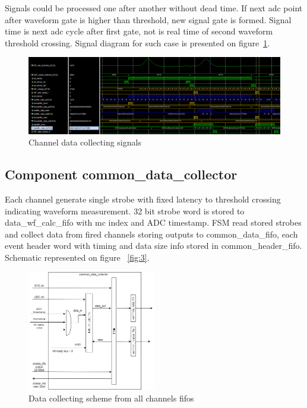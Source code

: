 \documentclass{article}
\begin{document}
Signals could be processed one after another without dead time. If next adc point after waveform gate is higher than threshold, new signal gate is formed. Signal time is next adc cycle after first gate, not is real time of second waveform threshold crossing. Signal diagram for such case is presented on figure~\ref{fig:5}.


\begin{figure}[H]
	\centering 
	\includegraphics[width=1.0\textwidth]{ADC_ch_data_collector_wave_pileup.png}
	\caption{\label{fig:5} Channel data collecting signals}
\end{figure}














\subsection{Component common\_data\_collector}
Each channel generate single strobe with fixed latency to threshold crossing indicating waveform measurement. 32 bit strobe word is stored to data\_wf\_calc\_fifo with mc index and ADC timestamp. FSM read stored strobes and collect data from fired channels storing outputs to common\_data\_fifo, each event header word with timing and data size info stored in common\_header\_fifo. Schematic represented on figure ~\ref{fig:3}.

\begin{figure}[H]
	\centering 
	\includegraphics[width=0.5\textwidth]{ADC_common_event_collection.png}
	\caption{\label{fig:6} Data collecting scheme from all channels fifos}
\end{figure}
\end{document}
